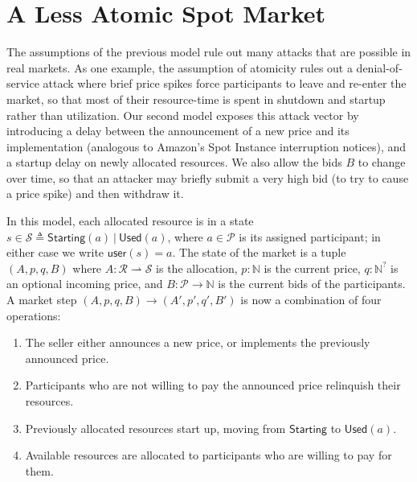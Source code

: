 \documentclass[acmsmall,review,screen]{acmart}
\begin{document}
\section{A Less Atomic Spot Market}
The assumptions of the previous model rule out many attacks that are possible in real markets. As one example, the assumption of atomicity rules out a denial-of-service attack where brief price spikes force participants to leave and re-enter the market, so that most of their resource-time is spent in shutdown and startup rather than utilization. Our second model exposes this attack vector by introducing a delay between the announcement of a new price and its implementation (analogous to Amazon's Spot Instance interruption notices), and a startup delay on newly allocated resources. We also allow the bids $B$ to change over time, so that an attacker may briefly submit a very high bid (to try to cause a price spike) and then withdraw it.

In this model, each allocated resource is in a state $s \in \mathcal{S} \triangleq \mathsf{Starting}(a) \ |\ \mathsf{Used}(a)$, where $a \in \mathcal{P}$ is its assigned participant; in either case we write $\mathsf{user}(s) = a$. The state of the market is a tuple $(A, p, q, B)$ where $A : \mathcal{R} \rightharpoonup \mathcal{S}$ is the allocation, $p : \mathbb{N}$ is the current price, $q : \mathbb{N}^?$ is an optional incoming price, and $B : \mathcal{P} \rightarrow \mathbb{N}$ is the current bids of the participants. A market step $(A, p, q, B) \rightarrow (A', p', q', B')$ is now a combination of four operations:
\begin{enumerate}
\item The seller either announces a new price, or implements the previously announced price.
\item Participants who are not willing to pay the announced price relinquish their resources.
\item Previously allocated resources start up, moving from $\mathsf{Starting}$ to $\mathsf{Used}(a)$.
\item Available resources are allocated to participants who are willing to pay for them.
\end{enumerate}
\end{document}
